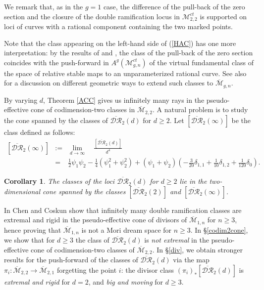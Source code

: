 \documentclass[10pt]{amsart}
\newtheorem{cor}{Corollary}[section]
\theoremstyle{definition}
\begin{document}
We remark that, as in the $g=1$ case, the difference of the pull-back of the zero section and the closure of the double ramification locus in ${\mathcal{M}}^{ct}_{2,2}$ is supported on loci of curves with a rational component containing the two marked points. 

Note that the class appearing on the left-hand side of (\ref{HAC}) has one more interpretation: by the results of \cite{MR2864866} and \cite{Marcus-Wise}, the class of the pull-back of the zero section coincides with the push-forward in $A^{g}({\mathcal{M}}_{g,n}^{ct})$ of the virtual fundamental class of the space of relative stable maps to an unparameterized rational curve. See also \cite{RPnotes2013} for a discussion on different geometric ways to extend such classes to ${\overline{\mathcal{M}}}_{g,n}$. 

By varying $d$, Theorem \ref{ACC} gives us infinitely many rays in the pseudo-effective cone of codimension-two classes in ${\overline{\mathcal{M}}}_{2,2}$.
A natural problem is to study the cone spanned by the classes of $\overline{\mathcal{DR}}_2(d)$ for $d\geq 2$. Let $\left[\overline{\mathcal{DR}}_2(\infty)\right]$ be the class defined as follows:
\begin{eqnarray*}
\left[\overline{\mathcal{DR}}_2(\infty)\right] \!\!&:=&\!\! \lim_{d\rightarrow \infty}\quad \frac{\left[\overline{\mathcal{DR}}_2(d)\right]}{d^4}\\
&=&\!\! \frac{1}{2}\psi_1\psi_2 -\frac{1}{4} \left(\psi_1^2+\psi_2^2\right)
+\left(\psi_1+\psi_2\right)\left(-\frac{3}{20} \delta_{1,1}
+\frac{1}{10}\delta_{1,2}+\frac{1}{120}\delta_0 \right).
\end{eqnarray*}

\begin{cor}
\label{cone}
The classes of the loci $\overline{\mathcal{DR}}_2(d)$ for $d\geq 2$ lie in the two-dimensional cone spanned by the classes $\left[\overline{\mathcal{DR}}_2(2)\right]$ and $\left[\overline{\mathcal{DR}}_2(\infty)\right]$.
\end{cor}

In \cite{MR3231020} Chen and Coskun show that infinitely many double ramification classes are extremal and rigid in the pseudo-effective cone of divisors of ${\overline{\mathcal{M}}}_{1,n}$ for $n\geq 3$, hence proving that ${\overline{\mathcal{M}}}_{1,n}$ is not a Mori dream space for $n\geq 3$. In \S\ref{codim2cone}, we show that for $d\geq 3$ the class of $\overline{\mathcal{DR}}_2(d)$ is {\it not extremal} in the pseudo-effective cone of codimension-two classes of ${\overline{\mathcal{M}}}_{2,2}$. In \S \ref{div}, we obtain stronger results for the push-forward of the classes of $\overline{\mathcal{DR}}_2(d)$ via the map $\pi_i\colon {\overline{\mathcal{M}}}_{2,2}\rightarrow{\overline{\mathcal{M}}}_{2,1}$ forgetting the point $i$: the divisor class $(\pi_i)_*\left[\overline{\mathcal{DR}}_2(d)\right]$ is {\it extremal and rigid} for $d=2$, and {\it big and moving} for $d\geq 3$.
\end{document}
